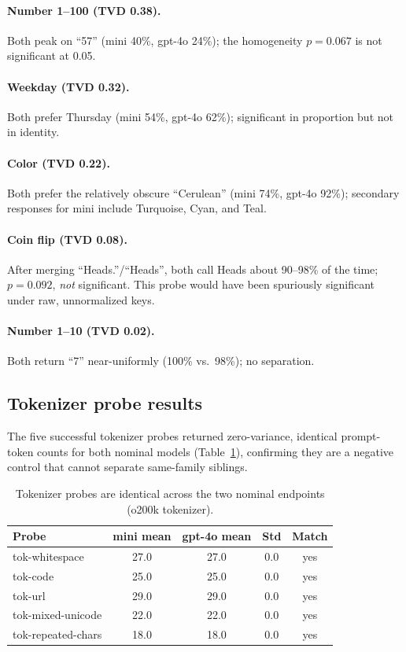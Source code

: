 \documentclass[11pt]{article}
\begin{document}
\paragraph{Number 1--100 (TVD 0.38).} Both peak on ``57'' (mini 40\%, gpt-4o 24\%); the homogeneity $p=0.067$ is not significant at 0.05.
\paragraph{Weekday (TVD 0.32).} Both prefer Thursday (mini 54\%, gpt-4o 62\%); significant in proportion but not in identity.
\paragraph{Color (TVD 0.22).} Both prefer the relatively obscure ``Cerulean'' (mini 74\%, gpt-4o 92\%); secondary responses for mini include Turquoise, Cyan, and Teal.
\paragraph{Coin flip (TVD 0.08).} After merging ``Heads.''/``Heads'', both call Heads about 90--98\% of the time; $p=0.092$, \emph{not} significant. This probe would have been spuriously significant under raw, unnormalized keys.
\paragraph{Number 1--10 (TVD 0.02).} Both return ``7'' near-uniformly (100\% vs.\ 98\%); no separation.

\subsection{Tokenizer probe results}
The five successful tokenizer probes returned zero-variance, identical prompt-token counts for both nominal models (Table~\ref{tab:tok}), confirming they are a negative control that cannot separate same-family siblings.

\begin{table}[h]
\centering
\small
\begin{tabular}{lcccc}
\toprule
Probe & mini mean & gpt-4o mean & Std & Match \\
\midrule
tok-whitespace & 27.0 & 27.0 & 0.0 & yes \\
tok-code & 25.0 & 25.0 & 0.0 & yes \\
tok-url & 29.0 & 29.0 & 0.0 & yes \\
tok-mixed-unicode & 22.0 & 22.0 & 0.0 & yes \\
tok-repeated-chars & 18.0 & 18.0 & 0.0 & yes \\
\bottomrule
\end{tabular}
\caption{Tokenizer probes are identical across the two nominal endpoints (o200k tokenizer).}\label{tab:tok}
\end{table}
\end{document}
